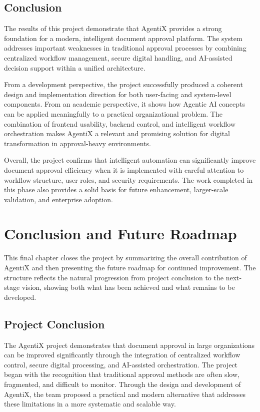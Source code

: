 \documentclass[12pt,oneside,openright,a4paper]{cpe-english-project}
\begin{document}
\section{Conclusion}

The results of this project demonstrate that AgentiX provides a strong foundation for a modern, intelligent document approval platform. The system addresses important weaknesses in traditional approval processes by combining centralized workflow management, secure digital handling, and AI-assisted decision support within a unified architecture.

From a development perspective, the project successfully produced a coherent design and implementation direction for both user-facing and system-level components. From an academic perspective, it shows how Agentic AI concepts can be applied meaningfully to a practical organizational problem. The combination of frontend usability, backend control, and intelligent workflow orchestration makes AgentiX a relevant and promising solution for digital transformation in approval-heavy environments.

Overall, the project confirms that intelligent automation can significantly improve document approval efficiency when it is implemented with careful attention to workflow structure, user roles, and security requirements. The work completed in this phase also provides a solid basis for future enhancement, larger-scale validation, and enterprise adoption.

\newpage

\chapter{Conclusion and Future Roadmap}

This final chapter closes the project by summarizing the overall contribution of AgentiX and then presenting the future roadmap for continued improvement. The structure reflects the natural progression from project conclusion to the next-stage vision, showing both what has been achieved and what remains to be developed.

\section{Project Conclusion}

The AgentiX project demonstrates that document approval in large organizations can be improved significantly through the integration of centralized workflow control, secure digital processing, and AI-assisted orchestration. The project began with the recognition that traditional approval methods are often slow, fragmented, and difficult to monitor. Through the design and development of AgentiX, the team proposed a practical and modern alternative that addresses these limitations in a more systematic and scalable way.
\end{document}
